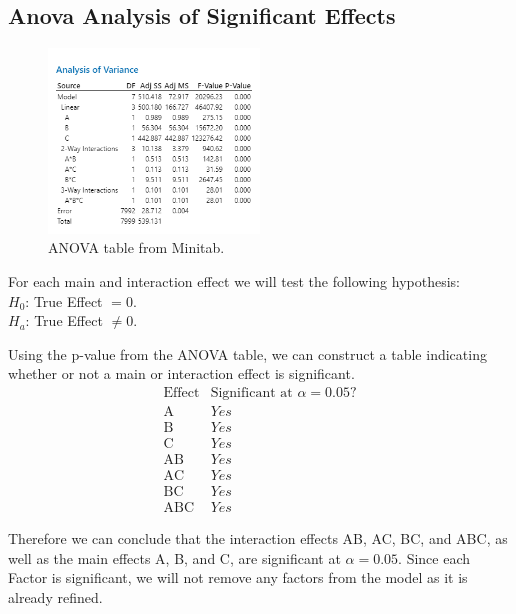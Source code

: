 \documentclass{article}
\begin{document}
\subsection{Anova Analysis of Significant Effects}
  \begin{figure}[h] %
    \centering
    \includegraphics[width=0.5\textwidth]{./images/anova.png}
    \caption{ANOVA table from Minitab.}
    \label{fig:anova}
  \end{figure}
  \begin{flushleft}
    For each main and interaction effect we will test the following hypothesis:\\

    $H_0$: True Effect $= 0$.\\
    $H_a$: True Effect $\neq 0$.\\
  \end{flushleft}
  Using the p-value from the ANOVA table, we can construct a table indicating whether or not a main or interaction effect is significant. \\
  \begin{equation*}
    \begin{array}{c|c}
        \text{Effect} & \text{Significant at }\alpha = 0.05 \text{?} \\
        \hline
        \text{A}   & Yes \\
        \text{B}   & Yes \\
        \text{C}   & Yes \\
        \text{AB}  & Yes \\
        \text{AC}  & Yes \\
        \text{BC}  & Yes \\
        \text{ABC} & Yes 
    \end{array}
    \end{equation*}
    \begin{flushleft}
      Therefore we can conclude that the interaction effects AB, AC, BC, and ABC, as well as the main effects A, B, and C, are significant at $\alpha = 0.05$.
      Since each Factor is significant, we will not remove any factors from the model as it is already refined.
    \end{flushleft}
\end{document}
